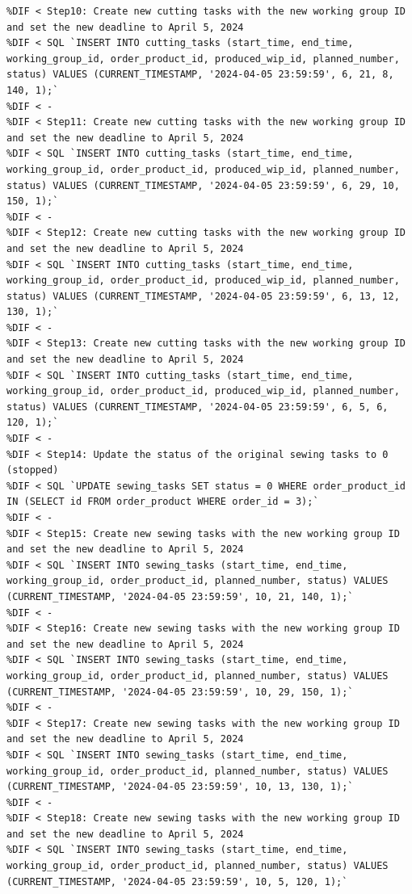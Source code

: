 \documentclass[preprint,12pt]{elsarticle}
\providecommand{\DIFmodbegin}{} %
\begin{document}
\DIFmodbegin
\begin{lstlisting}[style=my_operation, label={lst:chain_of_operation},alsolanguage=DIFcode]
%DIF < -
%DIF < Step10: Create new cutting tasks with the new working group ID and set the new deadline to April 5, 2024
%DIF < SQL `INSERT INTO cutting_tasks (start_time, end_time, working_group_id, order_product_id, produced_wip_id, planned_number, status) VALUES (CURRENT_TIMESTAMP, '2024-04-05 23:59:59', 6, 21, 8, 140, 1);`
%DIF < -
%DIF < Step11: Create new cutting tasks with the new working group ID and set the new deadline to April 5, 2024
%DIF < SQL `INSERT INTO cutting_tasks (start_time, end_time, working_group_id, order_product_id, produced_wip_id, planned_number, status) VALUES (CURRENT_TIMESTAMP, '2024-04-05 23:59:59', 6, 29, 10, 150, 1);`
%DIF < -
%DIF < Step12: Create new cutting tasks with the new working group ID and set the new deadline to April 5, 2024
%DIF < SQL `INSERT INTO cutting_tasks (start_time, end_time, working_group_id, order_product_id, produced_wip_id, planned_number, status) VALUES (CURRENT_TIMESTAMP, '2024-04-05 23:59:59', 6, 13, 12, 130, 1);`
%DIF < -
%DIF < Step13: Create new cutting tasks with the new working group ID and set the new deadline to April 5, 2024
%DIF < SQL `INSERT INTO cutting_tasks (start_time, end_time, working_group_id, order_product_id, produced_wip_id, planned_number, status) VALUES (CURRENT_TIMESTAMP, '2024-04-05 23:59:59', 6, 5, 6, 120, 1);`
%DIF < -
%DIF < Step14: Update the status of the original sewing tasks to 0 (stopped)
%DIF < SQL `UPDATE sewing_tasks SET status = 0 WHERE order_product_id IN (SELECT id FROM order_product WHERE order_id = 3);`
%DIF < -
%DIF < Step15: Create new sewing tasks with the new working group ID and set the new deadline to April 5, 2024
%DIF < SQL `INSERT INTO sewing_tasks (start_time, end_time, working_group_id, order_product_id, planned_number, status) VALUES (CURRENT_TIMESTAMP, '2024-04-05 23:59:59', 10, 21, 140, 1);`
%DIF < -
%DIF < Step16: Create new sewing tasks with the new working group ID and set the new deadline to April 5, 2024
%DIF < SQL `INSERT INTO sewing_tasks (start_time, end_time, working_group_id, order_product_id, planned_number, status) VALUES (CURRENT_TIMESTAMP, '2024-04-05 23:59:59', 10, 29, 150, 1);`
%DIF < -
%DIF < Step17: Create new sewing tasks with the new working group ID and set the new deadline to April 5, 2024
%DIF < SQL `INSERT INTO sewing_tasks (start_time, end_time, working_group_id, order_product_id, planned_number, status) VALUES (CURRENT_TIMESTAMP, '2024-04-05 23:59:59', 10, 13, 130, 1);`
%DIF < -
%DIF < Step18: Create new sewing tasks with the new working group ID and set the new deadline to April 5, 2024
%DIF < SQL `INSERT INTO sewing_tasks (start_time, end_time, working_group_id, order_product_id, planned_number, status) VALUES (CURRENT_TIMESTAMP, '2024-04-05 23:59:59', 10, 5, 120, 1);`
\end{lstlisting}
\end{document}
